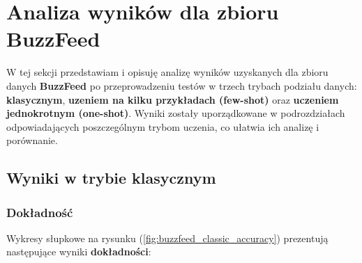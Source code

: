 \section{Analiza wyników dla zbioru \textbf{BuzzFeed}}
W tej sekcji przedstawiam i opisuję analizę wyników uzyskanych dla zbioru danych \textbf{BuzzFeed} po przeprowadzeniu testów w trzech trybach podziału danych: \textbf{klasycznym}, \textbf{uzeniem na kilku przykładach (few-shot)} oraz \textbf{uczeniem jednokrotnym (one-shot)}. Wyniki zostały uporządkowane w podrozdziałach odpowiadających poszczególnym trybom uczenia, co ułatwia ich analizę i porównanie.

\subsection{Wyniki w trybie klasycznym}
\subsubsection{Dokładność}
Wykresy słupkowe na rysunku (\ref{fig:buzzfeed_classic_accuracy}) prezentują następujące wyniki \textbf{dokładności}:
